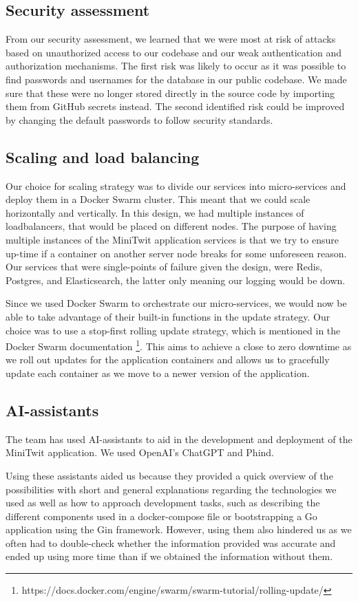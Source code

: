 \subsection{Security assessment}
From our security assessment, we learned that we were most at risk of attacks based on unauthorized access to our codebase and our weak authentication and authorization mechanisms. The first risk was likely to occur as it was possible to find passwords and usernames for the database in our public codebase. We made sure that these were no longer stored directly in the source code by importing them from GitHub secrets instead. The second identified risk could be improved by changing the default passwords to follow security standards.  

\subsection{Scaling and load balancing}

Our choice for scaling strategy was to divide our services into micro-services and deploy them in a Docker Swarm cluster. This meant that we could scale horizontally and vertically. In this design, we had multiple instances of loadbalancers, that would be placed on different nodes. The purpose of having multiple instances of the MiniTwit application services is that we try to ensure up-time if a container on another server node breaks for some unforeseen reason. Our services that were single-points of failure given the design, were Redis, Postgres, and Elasticsearch, the latter only meaning our logging would be down. 

Since we used Docker Swarm to orchestrate our micro-services, we would now be able to take advantage of their built-in functions in the update strategy. Our choice was to use a stop-first rolling update strategy, which is mentioned in the Docker Swarm documentation \footnote{https://docs.docker.com/engine/swarm/swarm-tutorial/rolling-update/}. This aims to achieve a close to zero downtime as we roll out updates for the application containers and allows us to gracefully update each container as we move to a newer version of the application.

\subsection{AI-assistants}
The team has used AI-assistants to aid in the development and deployment of the MiniTwit application. We used OpenAI's ChatGPT and Phind.

Using these assistants aided us because they provided a quick overview of the possibilities with short and general explanations regarding the technologies we used as well as how to approach development tasks, such as describing the different components used in a docker-compose file or bootstrapping a Go application using the Gin framework. However, using them also hindered us as we often had to double-check whether the information provided was accurate and ended up using more time than if we obtained the information without them. 

